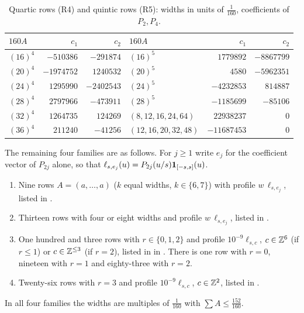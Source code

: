 \documentclass[11pt,colorlinks]{charlie}
\begin{document}
\begin{table}[ht]\centering\small
\caption{Quartic rows (R4) and quintic rows (R5): widths in units of $\frac1{160}$, coefficients of $P_2,P_4$.}\label{tab:quartic}
\begin{tabular}{@{}lrr@{\qquad}lrr@{}}
\toprule
$160A$&$c_1$&$c_2$&$160A$&$c_1$&$c_2$\\\midrule
$(16)^4$&$-510386$&$-291874$&$(16)^5$&$1779892$&$-8867799$\\
$(20)^4$&$-1974752$&$1240532$&$(20)^5$&$4580$&$-5962351$\\
$(24)^4$&$1295990$&$-2402543$&$(24)^5$&$-4232853$&$814887$\\
$(28)^4$&$2797966$&$-473911$&$(28)^5$&$-1185699$&$-85106$\\
$(32)^4$&$1264735$&$124269$&$(8,12,16,24,64)$&$22938237$&$0$\\
$(36)^4$&$211240$&$-41256$&$(12,16,20,32,48)$&$-11687453$&$0$\\
\bottomrule
\end{tabular}
\end{table}

The remaining four families are as follows. For $j\ge1$ write $e_j$ for the coefficient vector of $P_{2j}$ alone, so that $\ell_{s,e_j}(u)=P_{2j}(u/s)\mathbf{1}_{[-s,s]}(u)$.
\begin{enumerate}
\item[(R6)] Nine rows $A=(a,\dots,a)$ ($k$ equal widths, $k\in\{6,7\}$) with profile $w\,\ell_{s,e_j}$, listed in .
\item[(R7)] Thirteen rows with four or eight widths and profile $w\,\ell_{s,e_j}$, listed in .
\item[(R8)] One hundred and three rows with $r\in\{0,1,2\}$ and profile $10^{-9}\ell_{s,c}$, $c\in\mathbb{Z}^6$ (if $r\le1$) or $c\in\mathbb{Z}^{\le3}$ (if $r=2$), listed in  in . There is one row with $r=0$, nineteen with $r=1$ and eighty-three with $r=2$.
\item[(R9)] Twenty-six rows with $r=3$ and profile $10^{-9}\ell_{s,c}$, $c\in\mathbb{Z}^2$, listed in .
\end{enumerate}
In all four families the widths are multiples of $\frac1{160}$ with $\sum A\le\frac{152}{160}$.
\end{document}
